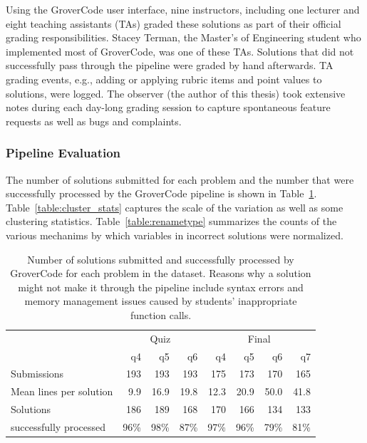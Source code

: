 Using the GroverCode user interface, nine instructors, including one lecturer and eight teaching assistants (TAs) graded these solutions as part of their official grading responsibilities. Stacey Terman, the Master's of Engineering student who implemented most of GroverCode, was one of these TAs. Solutions that did not successfully pass through the pipeline were graded by hand afterwards. TA grading events, e.g., adding or applying rubric items and point values to solutions, were logged. The observer (the author of this thesis) took extensive notes during each day-long grading session to capture spontaneous feature requests as well as bugs and complaints. 



\subsubsection{Pipeline Evaluation}

The number of solutions submitted for each problem and the number that were successfully processed by the GroverCode pipeline is shown in Table~\ref{table:num_submissions}. Table~\ref{table:cluster_stats} captures the scale of the variation as well as some clustering statistics. Table~\ref{table:renametype} summarizes the counts of the various mechanims by which variables in incorrect solutions were normalized.

\begin{table}[h!]
\centering
\begin{tabular}{l r|r|r|r|r|r|r}
& \multicolumn{3}{c}{Quiz} & \multicolumn{4}{c}{Final} \\
& q4 & q5 & q6 & q4 & q5 & q6 & q7 \\
\hline
Submissions & 193 & 193 & 193 & 175 & 173 & 170 & 165 \\
\hline
Mean lines per solution & 9.9 & 16.9 & 19.8 & 12.3 & 20.9 & 50.0 & 41.8 \\
\hline
Solutions & 186 & 189 & 168  & 170 & 166  & 134 & 133 \\
successfully processed & 96\% & 98\% & 87\% & 97\% & 96\% & 79\% & 81\% \\
\end{tabular}
\caption{Number of solutions submitted and successfully processed by GroverCode for each problem in the dataset. Reasons why a solution might not make it through the pipeline include syntax errors and memory management issues caused by students' inappropriate function calls.}
\label{table:num_submissions}
\end{table}


